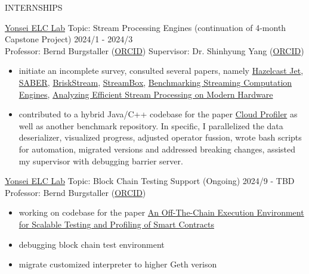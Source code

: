 \documentclass{resume} %
\begin{document}
\begin{rSection}{INTERNSHIPS} 

\href{https://elc.yonsei.ac.kr/}{Yonsei ELC Lab} \quad Topic: Stream Processing Engines
(continuation of 4-month Capstone Project)
 \hfill 2024/1 - 2024/3 \\ 
Professor: Bernd Burgstaller (\href{https://orcid.org/0000-0002-0374-8853}{ORCID}) 
\qquad Supervisor: Dr. Shinhyung Yang (\href{https://orcid.org/0000-0002-8997-9942}{ORCID})
\begin{itemize}
\item initiate an incomplete survey, consulted several papers, namely 
\href{https://arxiv.org/abs/2103.10169}{Hazelcast Jet},
\href{https://raulcastrofernandez.com/papers/sigmod16-saber.pdf}{SABER},
\href{https://arxiv.org/abs/1904.03604}{BriskStream},
\href{https://www.usenix.org/system/files/conference/atc17/atc17-miao.pdf}{StreamBox},
\href{https://ieeexplore.ieee.org/document/7530084}{Benchmarking Streaming Computation Engines},
\href{https://dl.acm.org/doi/10.14778/3303753.3303758}{Analyzing Efficient Stream Processing on Modern Hardware}
\item contributed to a hybrid Java/C++ codebase for the paper
\href{https://arxiv.org/abs/2205.09325}{Cloud Profiler} as well as another
benchmark repository. In specific, I parallelized the data deserializer,
visualized progress, adjusted operator fussion, wrote bash scripts for
automation, migrated versions and addressed breaking changes, assisted my
supervisor with debugging barrier server.
\end{itemize}

\href{https://elc.yonsei.ac.kr/}{Yonsei ELC Lab} \quad Topic: Block Chain Testing Support (Ongoing) \hfill 2024/9 - TBD \\ 
Professor: Bernd Burgstaller (\href{https://orcid.org/0000-0002-0374-8853}{ORCID}) 
\begin{itemize}
\item working on codebase for the paper
\href{https://www.usenix.org/conference/atc21/presentation/kim-yeonsoo}{An
Off-The-Chain Execution Environment for Scalable Testing and Profiling of Smart
Contracts}
\item debugging block chain test environment
\item migrate customized interpreter to higher Geth verison
\end{itemize}
\end{rSection} 

\end{document}
